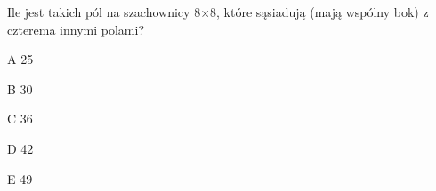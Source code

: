 \begin{tresc}
Ile jest takich pól na szachownicy 8×8, które sąsiadują (mają wspólny bok) z czterema innymi polami?
\end{tresc}
\begin{wariant}{A} 25 \end{wariant}
\begin{wariant}{B} 30 \end{wariant}
\begin{wariant}{C} 36 \end{wariant}
\begin{wariant}{D} 42 \end{wariant}
\begin{wariant}{E} 49 \end{wariant}
